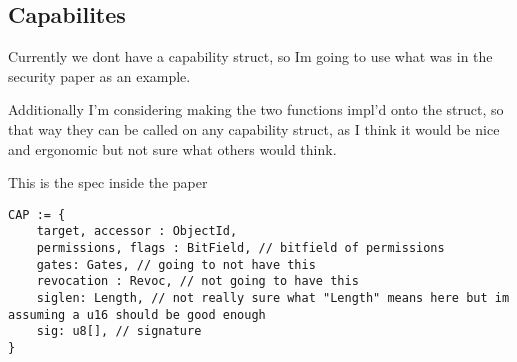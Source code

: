 \documentclass{article}
\begin{document}
\subsection{Capabilites}

Currently we dont have a capability struct, so Im going to use
what was in the security paper as an example.

Additionally I'm considering making the two functions impl'd onto the struct,
so that way they can be called on any capability struct, as I think it would
be nice and ergonomic but not sure what others would think.

This is the spec inside the paper

\begin{verbatim}
CAP := {
    target, accessor : ObjectId,
    permissions, flags : BitField, // bitfield of permissions
    gates: Gates, // going to not have this
    revocation : Revoc, // not going to have this
    siglen: Length, // not really sure what "Length" means here but im assuming a u16 should be good enough
    sig: u8[], // signature
}
\end{verbatim}
\end{document}
